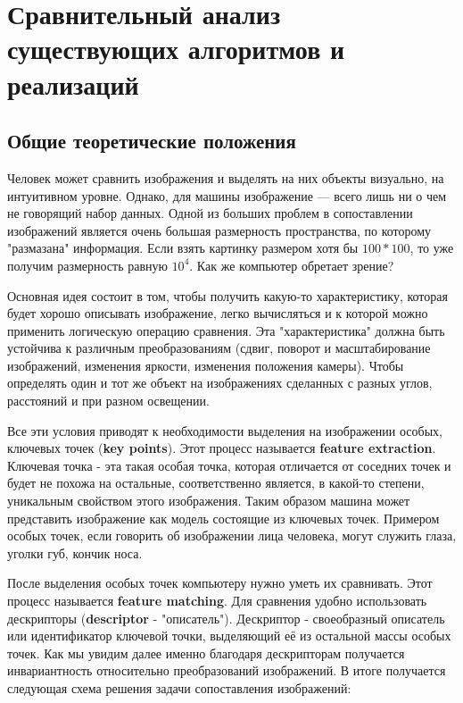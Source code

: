 \chapter{Сравнительный анализ существующих алгоритмов и реализаций}    

\section{Общие теоретические положения}   

Человек может сравнить изображения и выделять на них объекты визуально, на интуитивном уровне. Однако, для машины изображение — всего лишь ни о чем не говорящий набор данных. Одной из больших проблем в сопоставлении изображений является очень большая размерность пространства, по которому "размазана" информация. Если взять картинку размером хотя бы $100*100$, то уже получим размерность равную $10^4$. Как же компьютер обретает зрение?

Основная идея состоит в том, чтобы получить какую-то характеристику, которая будет хорошо описывать изображение, легко вычисляться и к которой можно применить логическую операцию сравнения. Эта "характеристика" должна быть устойчива к различным преобразованиям (сдвиг, поворот и масштабирование изображений, изменения яркости, изменения положения камеры). Чтобы определять один и тот же объект на изображениях сделанных с разных углов, расстояний и при разном освещении.

Все эти условия приводят к необходимости выделения на изображении особых, ключевых точек (\textbf{key points}). Этот процесс называется \textbf{feature extraction}. Ключевая точка - эта такая особая точка, которая отличается от соседних точек и будет не похожа на остальные, соответственно является, в какой-то степени, уникальным свойством этого изображения. Таким образом машина может представить изображение как модель состоящие из ключевых точек. Примером особых точек, если говорить об изображении лица человека, могут служить глаза, уголки губ, кончик носа. 

После выделения особых точек компьютеру нужно уметь их сравнивать. Этот процесс называется \textbf{feature matching}. Для сравнения удобно использовать дескрипторы (\textbf{descriptor} - "описатель"). Дескриптор - своеобразный описатель или идентификатор ключевой точки, выделяющий её из остальной массы особых точек. Как мы увидим далее именно благодаря дескрипторам получается инвариантность относительно преобразований изображений. 
В итоге получается следующая схема решения задачи сопоставления изображений:

